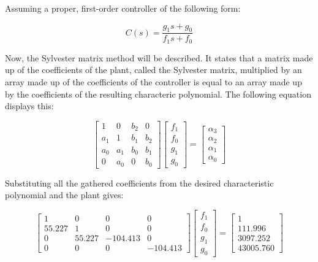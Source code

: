 \documentclass[11pt, letterpaper]{article}
\begin{document}
Assuming a proper, first-order controller of the following form:

\begin{equation}
    \label{eq:controller_model}
    C(s) = \frac{g_1 s + g_0}{f_1 s + f_0}
\end{equation}

Now, the Sylvester matrix method will be described. It states that a matrix
made up of the coefficients of the plant, called the Sylvester matrix, multiplied
by an array made up of the coefficients of the controller is equal to an array
made up by the coefficients of the resulting characteric polynomial. The following
equation displays this:

\begin{equation}
    \begin{bmatrix}
        1   & 0   & b_2 & 0   \\
        a_1 & 1   & b_1 & b_2 \\
        a_0 & a_1 & b_0 & b_1 \\
        0   & a_0 & 0   & b_0
    \end{bmatrix}
    \begin{bmatrix}
        f_1 \\
        f_0 \\
        g_1 \\
        g_0
    \end{bmatrix}
    =
    \begin{bmatrix}
        \alpha_3 \\
        \alpha_2 \\
        \alpha_1 \\
        \alpha_0
    \end{bmatrix}
\end{equation}

Substituting all the gathered coefficients from the desired characteristic polynomial and the
plant gives:

\begin{equation}
    \begin{bmatrix}
        1      & 0      & 0        & 0        \\
        55.227 & 1      & 0        & 0        \\
        0      & 55.227 & -104.413 & 0        \\
        0      & 0      & 0        & -104.413
    \end{bmatrix}
    \begin{bmatrix}
        f_1 \\
        f_0 \\
        g_1 \\
        g_0
    \end{bmatrix}
    =
    \begin{bmatrix}
        1        \\
        111.996  \\
        3097.252 \\
        43005.760
    \end{bmatrix}
\end{equation}
\end{document}
